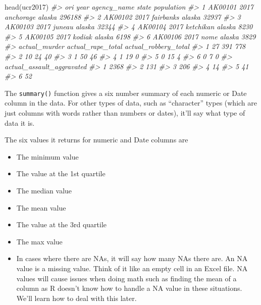 \documentclass[
]{krantz}
\makeatletter
\newenvironment{Shaded}{\begin{snugshade}}{\end{snugshade}}
\newcommand{\CommentTok}[1]{\textcolor[rgb]{0.37,0.37,0.37}{\textit{#1}}}
\newcommand{\FunctionTok}[1]{\textcolor[rgb]{0,0,0}{#1}}
\newcommand{\NormalTok}[1]{#1}
\providecommand{\tightlist}{%
  \setlength{\itemsep}{0pt}\setlength{\parskip}{0pt}}
\newenvironment{kframe}{%
\medskip{}
\setlength{\fboxsep}{.8em}
 \def\at@end@of@kframe{}%
 \ifinner\ifhmode%
  \def\at@end@of@kframe{\end{minipage}}%
  \begin{minipage}{\columnwidth}%
 \fi\fi%
 \def\FrameCommand##1{\hskip\@totalleftmargin \hskip-\fboxsep
 \colorbox{shadecolor}{##1}\hskip-\fboxsep
     \hskip-\linewidth \hskip-\@totalleftmargin \hskip\columnwidth}%
 \MakeFramed {\advance\hsize-\width
   \@totalleftmargin\z@ \linewidth\hsize
   \@setminipage}}%
 {\par\unskip\endMakeFramed%
 \at@end@of@kframe}
\renewenvironment{Shaded}{\begin{kframe}}{\end{kframe}}
\makeatother
\begin{document}
\begin{Shaded}
\begin{Highlighting}[]
\FunctionTok{head}\NormalTok{(ucr2017)}
\CommentTok{\#\textgreater{}       ori year agency\_name  state population}
\CommentTok{\#\textgreater{} 1 AK00101 2017   anchorage alaska     296188}
\CommentTok{\#\textgreater{} 2 AK00102 2017   fairbanks alaska      32937}
\CommentTok{\#\textgreater{} 3 AK00103 2017      juneau alaska      32344}
\CommentTok{\#\textgreater{} 4 AK00104 2017   ketchikan alaska       8230}
\CommentTok{\#\textgreater{} 5 AK00105 2017      kodiak alaska       6198}
\CommentTok{\#\textgreater{} 6 AK00106 2017        nome alaska       3829}
\CommentTok{\#\textgreater{}   actual\_murder actual\_rape\_total actual\_robbery\_total}
\CommentTok{\#\textgreater{} 1            27               391                  778}
\CommentTok{\#\textgreater{} 2            10                24                   40}
\CommentTok{\#\textgreater{} 3             1                50                   46}
\CommentTok{\#\textgreater{} 4             1                19                    0}
\CommentTok{\#\textgreater{} 5             0                15                    4}
\CommentTok{\#\textgreater{} 6             0                 7                    0}
\CommentTok{\#\textgreater{}   actual\_assault\_aggravated}
\CommentTok{\#\textgreater{} 1                      2368}
\CommentTok{\#\textgreater{} 2                       131}
\CommentTok{\#\textgreater{} 3                       206}
\CommentTok{\#\textgreater{} 4                        14}
\CommentTok{\#\textgreater{} 5                        41}
\CommentTok{\#\textgreater{} 6                        52}
\end{Highlighting}
\end{Shaded}

The \texttt{summary()} function gives a six number summary of each numeric or Date column in the data. For other types of data, such as ``character'' types (which are just columns with words rather than numbers or dates), it'll say what type of data it is.

The six values it returns for numeric and Date columns are

\begin{itemize}
\tightlist
\item
  The minimum value
\item
  The value at the 1st quartile
\item
  The median value
\item
  The mean value
\item
  The value at the 3rd quartile
\item
  The max value
\item
  In cases where there are NAs, it will say how many NAs there are. An NA value is a missing value. Think of it like an empty cell in an Excel file. NA values will cause issues when doing math such as finding the mean of a column as R doesn't know how to handle a NA value in these situations. We'll learn how to deal with this later.
\end{itemize}
\end{document}

